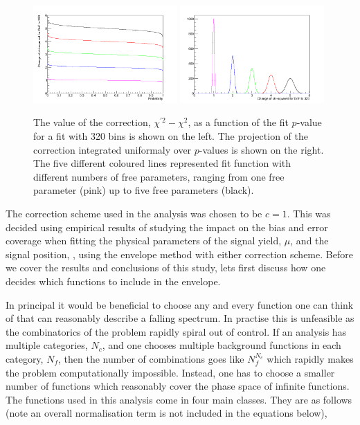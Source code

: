\begin{figure}
  \begin{center}
    \includegraphics[width=0.49\textwidth]{ch5_anal_and_results/plots/ChisqConv1.png}
    \includegraphics[width=0.49\textwidth]{ch5_anal_and_results/plots/ChisqConv2.png}
    \caption{The value of the correction, $\chi^{\prime 2} - \chi^{2}$, as a function of the fit $p$-value for a fit with 320 bins is shown on the left. The projection of the correction integrated uniformaly over $p$-values is shown on the right. The five different coloured lines represented fit function with different numbers of free parameters, ranging from one free parameter (pink) up to five free parameters (black).}
    \label{fig:envelope_chi2_correction}
  \end{center}
\end{figure}

The correction scheme used in the analysis was chosen to be $c=1$. This was decided using empirical results of studying the impact on the bias and error coverage when fitting the physical parameters of the signal yield, $\mu$, and the signal position, \mH, using the envelope method with either correction scheme. Before we cover the results and conclusions of this study, lets first discuss how one decides which functions to include in the envelope.

In principal it would be beneficial to choose any and every function one can think of that can reasonably describe a falling spectrum. In practise this is unfeasible as the combinatorics of the problem rapidly spiral out of control. If an analysis has multiple categories, $N_{c}$, and one chooses multiple background functions in each category, $N_{f}$, then the number of combinations goes like $N_{f}^{N_{c}}$ which rapidly makes the problem computationally impossible. Instead, one has to choose a smaller number of functions which reasonably cover the phase space of infinite functions. The functions used in this analysis come in four main classes. They are as follows (note an overall normalisation term is not included in the equations below),

